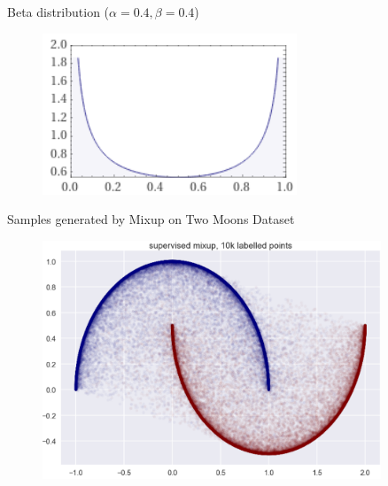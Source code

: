 \documentclass{beamer}
\begin{document}
\begin{frame}{Beta distribution ($\alpha=0.4, \beta=0.4$)}

\begin{figure}[h]
\includegraphics[width=\textwidth]{img/beta}
\end{figure}

\end{frame}

\begin{frame}{Samples generated by Mixup on Two Moons Dataset}

\begin{figure}[h]
\includegraphics[width=0.9\textwidth]{img/two_moons}
\end{figure}

\end{frame}
\end{document}
